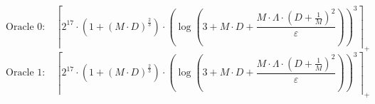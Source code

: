 \[\text{Oracle 0:}\quad \left\lceil 2^{17} \cdot \left(1 + \left(M \cdot D\right)^{\frac{2}{3}}\right) \cdot \left(\log\left(3 + M \cdot D + \frac{M \cdot \Lambda \cdot \left(D + \frac{1}{M}\right)^{2}}{\varepsilon}\right)\right)^{3} \right\rceil_{+}\]
\[\text{Oracle 1:}\quad \left\lceil 2^{17} \cdot \left(1 + \left(M \cdot D\right)^{\frac{2}{3}}\right) \cdot \left(\log\left(3 + M \cdot D + \frac{M \cdot \Lambda \cdot \left(D + \frac{1}{M}\right)^{2}}{\varepsilon}\right)\right)^{3} \right\rceil_{+}\]
